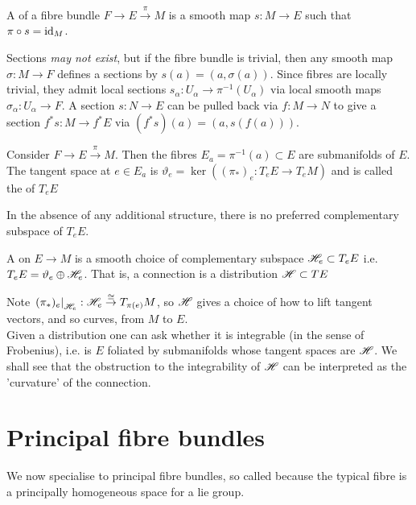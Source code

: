 \documentclass{article}
\begin{document}
\begin{definition}
A  of a fibre bundle $F \to E \overset{\pi}{\to} M$ is a smooth map $s:M \to E$ such that $\pi\circ s = \operatorname{id}_M$. 
\end{definition}

Sections \emph{may not exist}, but if the fibre bundle is trivial, then any smooth map $\sigma : M \to F$ defines a sections by $s(a) = (a,\sigma(a))$. Since fibres are locally trivial, they admit local sections $s_\alpha : U_\alpha \to \pi^{-1}(U_\alpha)$ via local smooth maps $\sigma_\alpha : U_\alpha \to F$. A section $s:N \to E$ can be pulled back via $f:M \to N$ to give a section $f^\ast s : M \to f^\ast E$ via $(f^\ast s)(a) = (a,s(f(a)))$. 

\begin{definition}
Consider $F \to E \overset{\pi}{\to} M$. Then the fibres $E_a = \pi^{-1}(a) \subset E$ are submanifolds of $E$. The tangent space at $e \in E_a$ is $\vartheta_e = \ker((\pi_\ast)_e : T_e E \to T_e M)$ and is called the  of $T_eE$
\end{definition}
In the absence of any additional structure, there is no preferred complementary subspace of $T_eE$.

\begin{definition}
A  on $E \to M$ is a smooth choice of complementary subspace $\mathscr{H}_e \subset T_e E$ i.e. $T_eE = \vartheta_e \oplus \mathscr{H}_e$. That is, a connection is a distribution $\mathscr{H}\subset TE$
\end{definition}

Note $\left. (\pi_\ast)_e \right\rvert_{\mathscr{H}_e} : \mathscr{H}_e \overset{\cong}{\to} T_{\pi(e)}M$, so $\mathscr{H}$ gives a choice of how to lift tangent vectors, and so curves, from $M$ to $E$. \\
Given a distribution one can ask whether it is integrable (in the sense of Frobenius), i.e. is $E$ foliated by submanifolds whose tangent spaces are $\mathscr{H}$. We shall see that the obstruction to the integrability of $\mathscr{H}$ can be interpreted as the 'curvature' of the connection. 
\section{Principal fibre bundles}
We now specialise to principal fibre bundles, so called because the typical fibre is a principally homogeneous space for a lie group. 
\end{document}
